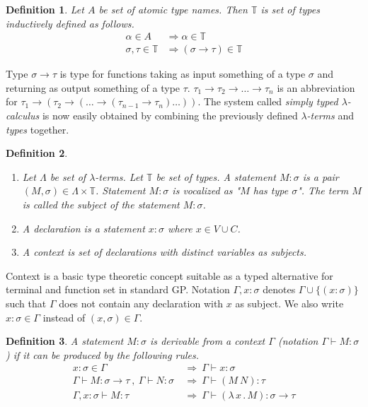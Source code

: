 \documentclass{sig-alternate}
\newtheorem{definition}{Definition}
\newcommand{\lterms}{$\lambda$-terms\xspace}
\newcommand{\tur}[3]{#1\vdash{}#2 \colon #3}
\newcommand{\then}{\Rightarrow\xspace}
\newcommand{\lamb}[2]{( \lambda \, #1 \, . \, #2 )}
\newcommand{\ar}{\rightarrow\xspace}
\newcommand{\T}{\mathbb{T}\xspace}
\begin{document}
\begin{definition}
Let $A$ be set of {\it atomic type names}. 
Then $\mathbb{T}$ is set of {\it types} inductively defined as follows.
\begin{align*}
\alpha      \in A  &\then   \alpha \in \T \\
\sigma,\tau \in \T &\then ( \sigma \ar  \tau ) \in \T 
\end{align*}
\end{definition}


Type $\sigma \ar \tau$ is type for functions taking as input
something of a type $\sigma$ and returning 
as output something of a type $\tau$. 
$\tau_1 \ar \tau_2 \ar \dots \ar \tau_n$ is an abbreviation for 
$\tau_1 \ar (\tau_2 \ar (\dots \ar (\tau_{n-1} \ar \tau_n)\dots))$.
The system called \textit{simply typed $\lambda$-calculus} is now easily obtained by
combining the previously defined \textit{\lterms} and \textit{types} together.

\begin{definition}~

\begin{enumerate}
 \item 	Let $\Lambda$ be set of {\it \lterms}. 
	Let $\mathbb{T}$ be set of {\it types}.       
	A {\it statement} $M : \sigma$ is a pair 
	$(M,\sigma) \in \Lambda \times \mathbb{T}$.
	Statement $M : \sigma$ is vocalized as 
	{\it "$M$ has type $\sigma$"}.
	The term $M$ is called the {\it subject} of the 
	statement $M : \sigma$.
 \item A \textit{declaration} is a statement 
 $x : \sigma$ where $x \in V \cup C$.
  
 \item A \textit{context} 
 is set of declarations with distinct variables as subjects.
\end{enumerate}
\end{definition}

Context is a basic type theoretic concept suitable as a typed alternative
for terminal and function set in standard GP. 
Notation $\Gamma,x:\sigma $ denotes $ \Gamma\cup\{(x:\sigma)\}$ 
such that $\Gamma$ does not contain any declaration with $x$ as subject.
We also write $x:\sigma \in \Gamma$ instead of $(x,\sigma) \in \Gamma$.

\begin{definition}
A statement $M\colon\sigma$ is \textit{derivable from}
a context $\Gamma$ (notation 
\mbox{$\Gamma\vdash{}M\colon\sigma$}) 
if it can be produced by the following rules.
\begin{align*}
x : \sigma \in \Gamma &~\then~ \tur{\Gamma}{x}{\sigma}\\
\tur{\Gamma}{M}{\sigma \ar \tau}~,~\tur{\Gamma}{N}{\sigma} 
&~\then~ \tur{\Gamma}{(M~N)}{\tau}\\  
\tur{\Gamma,x:\sigma}{M}{\tau}
&~\then~ \tur{\Gamma}{\lamb{x}{M}}{\sigma \ar \tau} 
\end{align*}
\end{definition}
\end{document}
